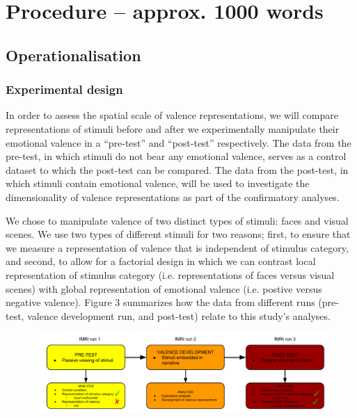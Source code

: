 \documentclass[12pt,a4paper]{article}\usepackage[]{graphicx}\usepackage[]{color}
\begin{document}
\noindent
\wordcount 

\section{Procedure \textmd{– approx. 1000 words}}
\subsection{Operationalisation}
\subsubsection{Experimental design}
In order to assess the spatial scale of valence representations, we will compare representations of stimuli before and after we experimentally manipulate their emotional valence in a ``pre-test'' and ``post-test'' respectively. The data from the pre-test, in which stimuli do not bear any emotional valence, serves as a control dataset to which the post-test can be compared. The data from the post-test, in which stimuli contain emotional valence, will be used to investigate the dimensionality of valence representations as part of the confirmatory analyses.      

We chose to manipulate valence of two distinct types of stimuli: faces and visual scenes. We use two types of different stimuli for two reasons; first, to ensure that we measure a representation of valence that is independent of stimulus category, and second, to allow for a factorial design in which we can contrast local representation of stimulus category (i.e. representations of faces versus visual scenes) with global representation of emotional valence (i.e. postive versus negative valence). Figure 3 summarizes how the data from different runs (pre-test, valence development run, and post-test) relate to this study's analyses.

\begin{figure}[h]
\centering
\includegraphics[scale=.32]{runs_exp}
\end{figure}
\end{document}
